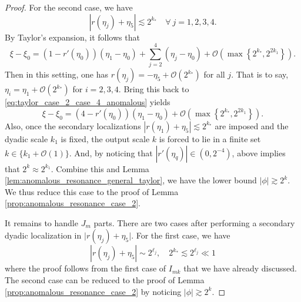 \documentclass[reqno,english,11pt]{amsart}
\theoremstyle{definition}
\numberwithin{equation}{section}
\begin{document}
\begin{proof}
For the second case, we have
$$|r(\eta_j)+\eta_5|\lesssim 2^{k_{*}} \quad \forall\ j=1,2,3,4. $$
By Taylor's expansion, it follows that
\begin{equation}
\xi-\xi_0 =\left(1-r'(\eta_0)\right)\left(\eta_1-\eta_0\right) + \sum_{j=2}^4 \left(\eta_j-\eta_0\right)+\mathcal{O}\left(\max\left\{2^{k_*},2^{2k_1}\right\}\right). \label{eq:taylor_case_2_case_4_anomalous}
\end{equation}
Then in this setting, one has  $r(\eta_j)=-\eta_5+\mathcal{O}(2^{k_*})$ for all $j$. That is to say, $\eta_{i}=\eta_1+\mathcal{O}(2^{k_*})$ for $i=2,3,4$. Bring this back to \eqref{eq:taylor_case_2_case_4_anomalous} yields
\begin{equation*}
\xi-\xi_0 = \left(4-r'(\eta_0)\right)\left(\eta_1-\eta_0\right) + \mathcal{O}\left(\max\left\{2^{k_*},2^{2k_1}\right\}\right).
\end{equation*}
Also, once the secondary localizations $|r(\eta_1)+\eta_5|\lesssim 2^{k_*}$ are imposed and the dyadic scale $k_1$ is fixed, the output scale $k$ is forced to lie in a finite set $k\in\{k_1+\mathcal{O}(1)\}$. And, by noticing that $|r'(\eta_q)|\in (0,2^{-4})$, above implies that $2^{k}\approx 2^{k_1}$. Combine this and Lemma \ref{lem:anomalous_resonance_general_taylor}, we have the lower bound $|\phi|\gtrsim 2^{k}$. We thus reduce this case to the proof of Lemma \ref{prop:anomalous_resonance_case_2}.


\par It remains to handle $J_{m}$ parts. There are two cases after performing a secondary dyadic localization in $\vert r(\eta_j)+\eta_5\vert$. For the first case, we have $$|r(\eta_j)+\eta_5|\sim 2^{\ell_j},\quad 2^{k_*}\lesssim 2^{\ell_j}\ll 1$$ 
where the proof follows from the first case of $I_{mk}$ that we have already discussed. The second case can be reduced to the proof of Lemma \ref{prop:anomalous_resonance_case_2} by noticing $|\phi|\gtrsim  2^{k}$. 
\end{proof}
\end{document}
